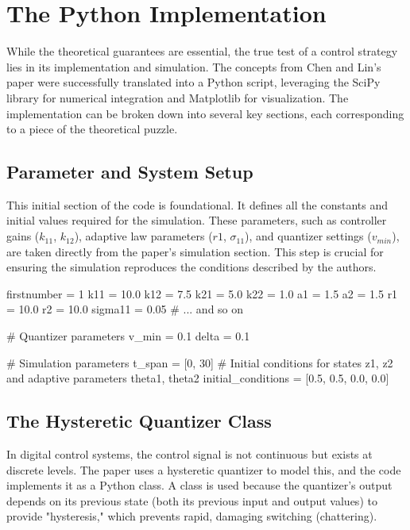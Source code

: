 \FloatBarrier
\section{The Python Implementation}
While the theoretical guarantees are essential, the true test of a control strategy lies in its implementation and simulation. The concepts from Chen and Lin's paper were successfully translated into a Python script, leveraging the SciPy library for numerical integration and Matplotlib for visualization. The implementation can be broken down into several key sections, each corresponding to a piece of the theoretical puzzle.

\subsection{Parameter and System Setup}
This initial section of the code is foundational. It defines all the constants and initial values required for the simulation. These parameters, such as controller gains ($k_{11}$, $k_{12}$), adaptive law parameters ($r1$, $\sigma_{11}$), and quantizer settings ($v_{min}$), are taken directly from the paper's simulation section. This step is crucial for ensuring the simulation reproduces the conditions described by the authors.

\begin{code}
	\begin{matlabcode}{firstnumber = 1}
k11 = 10.0
k12 = 7.5
k21 = 5.0
k22 = 1.0
a1 = 1.5
a2 = 1.5
r1 = 10.0
r2 = 10.0
sigma11 = 0.05
# ... and so on

# Quantizer parameters
v_min = 0.1
delta = 0.1

# Simulation parameters
t_span = [0, 30]
# Initial conditions for states z1, z2 and adaptive parameters theta1, theta2
initial_conditions = [0.5, 0.5, 0.0, 0.0]
	\end{matlabcode}
	\label{code:p31}
\end{code}

\subsection{The Hysteretic Quantizer Class}
In digital control systems, the control signal is not continuous but exists at discrete levels. The paper uses a hysteretic quantizer to model this, and the code implements it as a Python class. A class is used because the quantizer's output depends on its previous state (both its previous input and output values) to provide "hysteresis," which prevents rapid, damaging switching (chattering).

